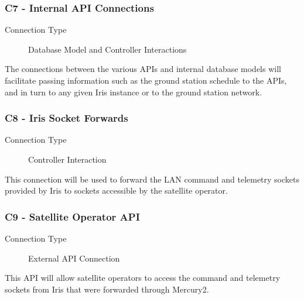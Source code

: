 \documentclass{mxl-note}
\begin{document}
\subsubsection{C7 - Internal API Connections}
\begin{description}
	\item [Connection Type] Database Model and Controller Interactions
\end{description}
The connections between the various APIs and internal database models will facilitate passing information such as the ground station schedule to the APIs, and in turn to any given Iris instance or to the ground station network.

\subsubsection{C8 - Iris Socket Forwards}
\begin{description}
	\item [Connection Type] Controller Interaction
\end{description}
This connection will be used to forward the LAN command and telemetry sockets provided by Iris to sockets accessible by the satellite operator. 

\subsubsection{C9 - Satellite Operator API}
\begin{description}
	\item [Connection Type] External API Connection
\end{description}
This API will allow satellite operators to access the command and telemetry sockets from Iris that were forwarded through Mercury2.
\end{document}
